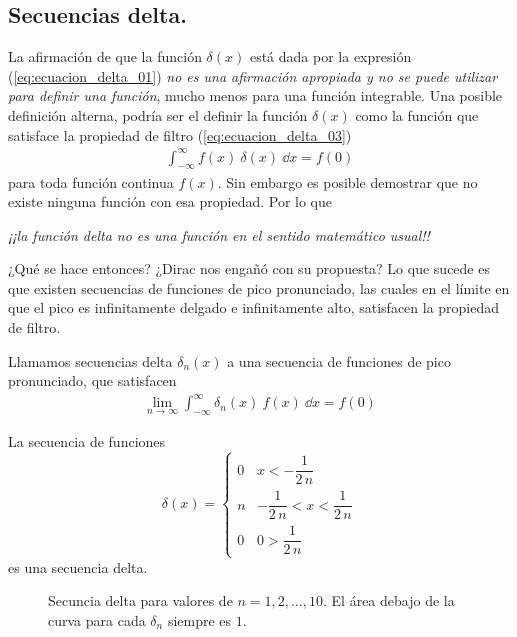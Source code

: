 \subsection{Secuencias delta.}\label{secuencias_delta}
La afirmación de que la función $\delta (x)$ está dada por la expresión (\ref{eq:ecuacion_delta_01}) \textit{no es una afirmación apropiada y no se puede utilizar para definir una función}, mucho menos para una función integrable. Una posible definición alterna, podría ser el definir la función $\delta (x)$ como la función que satisface la propiedad de filtro (\ref{eq:ecuacion_delta_03})
\begin{align*}
\int_{-\infty}^{\infty} f(x) \: \delta (x) \: \dd{x} = f(0)
\end{align*}
para toda función continua $f(x)$. Sin embargo es posible demostrar que no existe ninguna función con esa propiedad. Por lo que 
\begin{center}
\textit{¡¡la función delta no es una función en el sentido matemático usual!!}
\end{center}
¿Qué se hace entonces?  ¿Dirac nos engañó con su propuesta? Lo que sucede es que existen secuencias de funciones de pico pronunciado, las cuales en el límite en que el pico es infinitamente delgado e infinitamente alto, satisfacen la propiedad de filtro.
\begin{defi}
Llamamos secuencias delta $\delta_{n} (x)$ a una secuencia de funciones de pico pronunciado, que satisfacen
\begin{align*}
\lim_{n \to \infty} \int_{-\infty}^{\infty} \delta_{n} (x) \: f(x) \: \dd{x} =  f(0)
\end{align*}
\end{defi}
\begin{ejemplo}
La secuencia de funciones
\begin{equation}
\delta (x) = \begin{cases}
0 & x < - \dfrac{1}{2 \, n} \\
n & - \dfrac{1}{2 \, n} < x < \dfrac{1}{2 \, n} \\
0 & 0 >  \dfrac{1}{2 \, n}
\end{cases}
\label{eq:ecuacion_delta_04}
\end{equation}
es una secuencia delta.
\end{ejemplo}
\begin{figure}[H]
\centering

\caption{Secuncia delta para valores de $n=1,2,\ldots,10$. El área debajo de la curva para cada $\delta_{n}$ siempre es $1$.}
\label{fig:secuncia_delta_01}
\end{figure}
